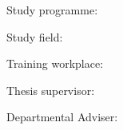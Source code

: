 
%
%
%
%
%




\begin{footnotesize}
\noindent
Study programme: \myStudyProgram

\noindent
Study field: \myStudyField

\noindent
Training workplace: \myInstitude

\noindent
Thesis supervisor: \mySupervisor

\noindent
Departmental Adviser: \myDepartSupervisor

\medskip{}

\myDate
\end{footnotesize}

\newpage
\thispagestyle{empty}
\mbox{}
\newpage
